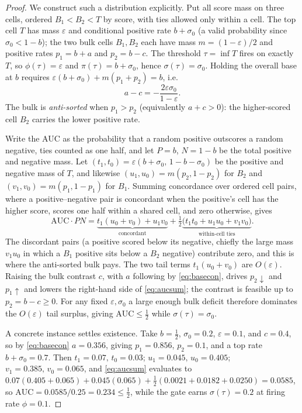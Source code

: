 \documentclass[10pt, a4paper, oneside]{article}
\theoremstyle{definition}
\theoremstyle{plain}
\begin{document}
\begin{proof}
We construct such a distribution explicitly. Put all score mass on three cells,
ordered $B_1 < B_2 < T$ by score, with ties allowed only within a cell. The top cell
$T$ has mass $\varepsilon$ and conditional positive rate $b+\sigma_0$ (a valid
probability since $\sigma_0<1-b$); the two bulk cells $B_1,B_2$ each have mass
$m=(1-\varepsilon)/2$ and positive rates $p_1=b+a$ and $p_2=b-c$. The threshold
$\tau=\inf T$ fires on exactly $T$, so $\phi(\tau)=\varepsilon$ and
$\pi(\tau)=b+\sigma_0$, hence $\sigma(\tau)=\sigma_0$. Holding the overall base at $b$
requires $\varepsilon(b+\sigma_0)+m(p_1+p_2)=b$, i.e.
\begin{equation}
\label{eq:basecon}
a-c=-\frac{2\varepsilon\sigma_0}{1-\varepsilon}.
\end{equation}
The bulk is \emph{anti-sorted} when $p_1>p_2$ (equivalently $a+c>0$): the
higher-scored cell $B_2$ carries the lower positive rate.

Write the AUC as the probability that a random positive outscores a random negative,
ties counted as one half, and let $P=b$, $N=1-b$ be the total positive and negative
mass. Let $(t_1,t_0)=\varepsilon(b+\sigma_0,\,1-b-\sigma_0)$ be the positive and
negative mass of $T$, and likewise $(u_1,u_0)=m(p_2,1-p_2)$ for $B_2$ and
$(v_1,v_0)=m(p_1,1-p_1)$ for $B_1$. Summing concordance over ordered cell pairs, where
a positive--negative pair is concordant when the positive's cell has the higher score,
scores one half within a shared cell, and zero otherwise, gives
\begin{equation}
\label{eq:aucsum}
\mathrm{AUC}\cdot PN
=\underbrace{t_1(u_0+v_0)+u_1 v_0}_{\text{concordant}}
+\tfrac12\underbrace{\big(t_1 t_0+u_1 u_0+v_1 v_0\big)}_{\text{within-cell ties}} .
\end{equation}
The discordant pairs (a positive scored below its negative, chiefly the large mass
$v_1 u_0$ in which a $B_1$ positive sits below a $B_2$ negative) contribute zero, and
this is where the anti-sorted bulk pays. The two tail terms $t_1(u_0+v_0)$ are
$O(\varepsilon)$. Raising the bulk contrast $c$, with $a$ following by
\eqref{eq:basecon}, drives $p_2\!\downarrow$ and $p_1\!\uparrow$ and lowers the
right-hand side of \eqref{eq:aucsum}; the contrast is feasible up to $p_2=b-c\ge 0$.
For any fixed $\varepsilon,\sigma_0$ a large enough bulk deficit therefore dominates the
$O(\varepsilon)$ tail surplus, giving $\mathrm{AUC}\le\tfrac12$ while $\sigma(\tau)=\sigma_0$.

A concrete instance settles existence. Take $b=\tfrac12$, $\sigma_0=0.2$,
$\varepsilon=0.1$, and $c=0.4$, so by \eqref{eq:basecon} $a=0.356$, giving $p_1=0.856$,
$p_2=0.1$, and a top rate $b+\sigma_0=0.7$. Then $t_1=0.07,\,t_0=0.03$;
$u_1=0.045,\,u_0=0.405$; $v_1=0.385,\,v_0=0.065$, and \eqref{eq:aucsum} evaluates to
$0.07(0.405{+}0.065)+0.045(0.065)+\tfrac12(0.0021{+}0.0182{+}0.0250)=0.0585$, so
$\mathrm{AUC}=0.0585/0.25=0.234\le\tfrac12$, while the gate earns $\sigma(\tau)=0.2$ at
firing rate $\phi=0.1$.
\end{proof}
\end{document}
